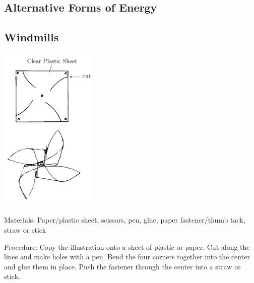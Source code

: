 \begin{multicols}{2}
\vfill
\columnbreak


\section*{Alternative Forms of Energy} 


\subsection{Windmills} 

\begin{center}
\includegraphics[width=0.35\textwidth]{./img/windmill.png}
\end{center}

\begin{description*}
\item[Materials:]{Paper/plastic sheet, scissors, pen, glue, paper fastener/thumb tack, straw or stick}
\item[Procedure:]{Copy the illustration onto a sheet of plastic or paper. Cut along the lines and make holes with a pen. Bend the four corners together into the center and glue them in place. Push the fastener through the center into a straw or stick.}
\end{description*}


\end{multicols}
